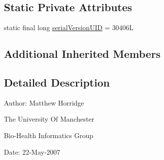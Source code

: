 \subsection*{Static Private Attributes}
\begin{DoxyCompactItemize}
\item 
static final long \hyperlink{classuk_1_1ac_1_1manchester_1_1cs_1_1owl_1_1owlapi_1_1mansyntaxrenderer_1_1_manchester_o_w_l_syntax_ontology_storer_exception_af2d878f8045db45e2dade9c0d4782c09}{serial\-Version\-U\-I\-D} = 30406\-L
\end{DoxyCompactItemize}
\subsection*{Additional Inherited Members}


\subsection{Detailed Description}
Author\-: Matthew Horridge\par
 The University Of Manchester\par
 Bio-\/\-Health Informatics Group\par
 Date\-: 22-\/\-May-\/2007\par
\par
 

